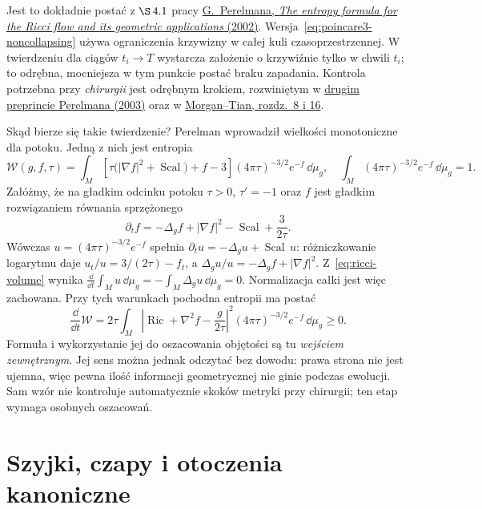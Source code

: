 Jest to dokładnie postać z $\S\,4.1$ pracy
\href{https://arxiv.org/pdf/math/0211159}
{G.\ Perelmana, \emph{The entropy formula for the
Ricci flow and its geometric applications} (2002)}.
Wersja~\eqref{eq:poincare3-noncollapsing}
używa ograniczenia krzywizny w całej kuli
czasoprzestrzennej. W twierdzeniu dla ciągów
$t_i\to T$ wystarcza założenie o krzywiźnie
tylko w chwili $t_i$; to odrębna, mocniejsza
w tym punkcie postać braku zapadania.
Kontrola potrzebna przy \emph{chirurgii} jest
odrębnym krokiem, rozwiniętym w
\href{https://arxiv.org/pdf/math/0303109}
{drugim preprincie Perelmana (2003)} oraz
w \href{https://www.claymath.org/library/monographs/cmim03.pdf}
{Morgan--Tian, rozdz.\ 8 i 16}.

Skąd bierze się takie twierdzenie? Perelman
wprowadził wielkości monotoniczne dla potoku.
Jedną z nich jest entropia
\[
 \mathcal W(g,f,\tau)=
 \int_M\left[\tau\bigl(|\nabla f|^2
                  +\operatorname{Scal}\bigr)+f-3\right]
 (4\pi\tau)^{-3/2}e^{-f}\,\dd\mu_g,
 \quad
 \int_M(4\pi\tau)^{-3/2}e^{-f}\,\dd\mu_g=1.
\]
Załóżmy, że na gładkim odcinku potoku $\tau>0$, $\tau'=-1$
oraz $f$ jest gładkim rozwiązaniem równania sprzężonego
\[
 \partial_t f=-\Delta_gf+|\nabla f|^2
              -\operatorname{Scal}+\frac{3}{2\tau}.
\]
Wówczas $u=(4\pi\tau)^{-3/2}e^{-f}$ spełnia
$\partial_tu=-\Delta_gu+\operatorname{Scal}\,u$:
różniczkowanie logarytmu daje
$u_t/u=3/(2\tau)-f_t$, a
$\Delta_gu/u=-\Delta_gf+|\nabla f|^2$.
Z~\eqref{eq:ricci-volume} wynika
$\frac{\dd}{\dd t}\int_Mu\,\dd\mu_g
=-\int_M\Delta_gu\,\dd\mu_g=0$.
Normalizacja całki jest więc zachowana. Przy tych warunkach
pochodna entropii ma postać
\begin{equation}\label{eq:poincare3-entropy}
 \frac{\dd}{\dd t}\mathcal W
 =2\tau\int_M
 \left|\operatorname{Ric}+\nabla^2f
              -\frac{g}{2\tau}\right|^2
 (4\pi\tau)^{-3/2}e^{-f}\,\dd\mu_g\geq0.
\end{equation}
Formuła i wykorzystanie jej do oszacowania objętości
są tu \emph{wejściem zewnętrznym}. Jej sens można
jednak odczytać bez dowodu: prawa strona nie jest
ujemna, więc pewna ilość informacji geometrycznej
nie ginie podczas ewolucji. Sam wzór nie kontroluje
automatycznie skoków metryki przy chirurgii;
ten etap wymaga osobnych oszacowań.

\section{Szyjki, czapy i otoczenia kanoniczne}
\label{sec:poincare3-kanoniczne}


